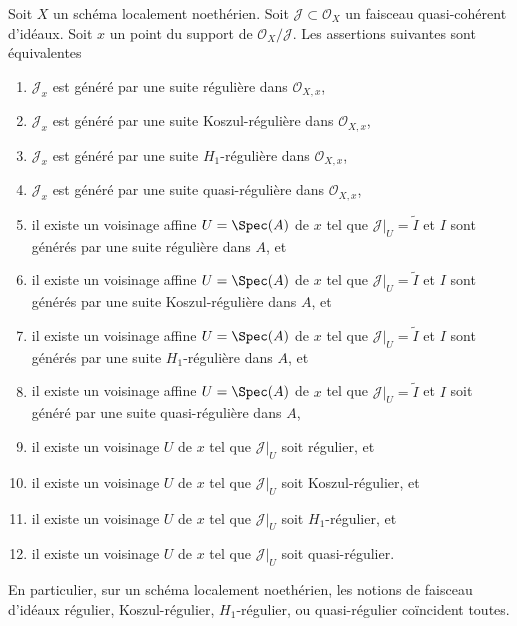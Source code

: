 \begin{lemma}
\label{lemma-Noetherian-scheme-regular-ideal}
Soit  $X$  un schéma localement noethérien. Soit  $\mathcal{J} \subset \mathcal{O}_X$  un faisceau
quasi-cohérent d’idéaux. Soit  $x$  un point du support de  $\mathcal{O}_X/\mathcal{J}$.
Les assertions suivantes sont équivalentes
\begin{enumerate}
\item $\mathcal{J}_x$  est généré par une suite régulière dans  $\mathcal{O}_{X, x}$,
\item $\mathcal{J}_x$  est généré par une suite Koszul-régulière dans  $\mathcal{O}_{X, x}$,
\item $\mathcal{J}_x$  est généré par une suite  $H_1$-régulière dans  $\mathcal{O}_{X, x}$,
\item $\mathcal{J}_x$  est généré par une suite quasi-régulière dans  $\mathcal{O}_{X, x}$,
\item il existe un voisinage affine  $U = \Spec(A)$  de  $x$  tel que  $\mathcal{J}|_U = \widetilde{I}$  et
 $I$  sont générés par une suite régulière dans  $A$, et
\item il existe un voisinage affine  $U = \Spec(A)$  de  $x$  tel que  $\mathcal{J}|_U = \widetilde{I}$  et
 $I$  sont générés par une suite Koszul-régulière dans  $A$, et
\item il existe un voisinage affine  $U = \Spec(A)$  de  $x$  tel que  $\mathcal{J}|_U = \widetilde{I}$  et
 $I$  sont générés par une suite  $H_1$-régulière dans  $A$,
et
\item il existe un voisinage affine  $U = \Spec(A)$  de  $x$  tel que  $\mathcal{J}|_U = \widetilde{I}$  et
 $I$  soit généré par une suite quasi-régulière dans  $A$,
\item il existe un voisinage  $U$  de  $x$  tel que  $\mathcal{J}|_U$  soit
régulier, et
\item il existe un voisinage  $U$  de  $x$  tel que  $\mathcal{J}|_U$  soit
Koszul-régulier, et
\item il existe un voisinage  $U$  de  $x$  tel que  $\mathcal{J}|_U$  soit
 $H_1$-régulier, et
\item il existe un voisinage  $U$  de  $x$  tel que  $\mathcal{J}|_U$  soit
quasi-régulier.
\end{enumerate}
En particulier, sur un schéma localement noethérien, les notions de faisceau
d'idéaux régulier, Koszul-régulier,  $H_1$-régulier, ou quasi-régulier
coïncident toutes.
\end{lemma}

